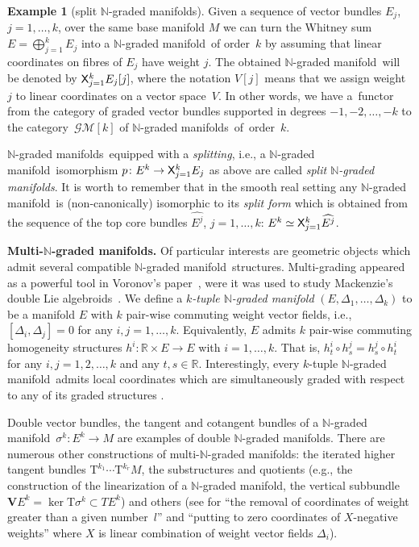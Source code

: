 \documentclass[10pt,a4paper]{amsart}
\newcommand{\grB}{{$\N$-graded manifold}}
\newcommand{\grBs}{{$\N$-graded manifolds}}
\newcommand{\degree}{{order}}
\newcommand{\R}{\mathbb{R}}
\newcommand{\N}{\mathbb{N}}
\newcommand{\V}{\mathbf{V}} %
\newcommand{\ra}{\rightarrow}
\newcommand{\Cross}{{\sf X}} %
\newcommand{\T}{\mathrm{T}} %
\newcommand{\core}[1]{\widehat{#1}} %
\newcommand{\catGB}{\mathcal{GM}}
\numberwithin{equation}{section}
\theoremstyle{definition}
\newtheorem{ex}[thm]{Example}
\begin{document}
\begin{ex}[split \grBs]\label{ex:split_gr_bndl} Given a sequence of vector bundles $E_j$, $j=1, \ldots, k$, over the same base manifold $M$ we can turn the Whitney sum $E =\bigoplus_{j=1}^k E_j$ into a \grB\ of \degree\ $k$ by assuming that linear coordinates on fibres of $E_j$ have weight $j$. The obtained \grB\ will be denoted by $\Cross_{j=1}^k E_j[j]$, where the notation $V[j]$ means that we assign weight $j$ to linear coordinates on a vector space~$V$. In other words, we have a~functor from the category of graded vector bundles supported in degrees $-1, -2, \ldots, -k$ to the category~$\catGB[k]$ of \grBs\ of~\degree\ $k$.

\grBs\ equipped with a \emph{splitting}, i.e., a \grB\ isomorphism $p\colon E^k \ra \Cross_{j=1}^k E_j$ as above are called \emph{split \grBs}. It is worth to remember that in the smooth real setting any \grB\ is (non-canonically) isomorphic to its \emph{split form} which is obtained from the sequence of the top core bundles $\core{E^j}$, $j=1, \ldots, k$: $E^k \simeq \Cross_{j=1}^k \core{E^j}$.
\end{ex}

{\bf Multi-\grBs.} Of particular interests are geometric objects which admit several compatible \grB\ structures. Multi-grading appeared as a powerful tool in Voronov's paper~\cite{Voronov_2012}, were it was used to study Mackenzie's double Lie algebroids~\cite{Mackenzie_1992}.
We define a \emph{$k$-tuple \grB} $(E, \Delta_1, \ldots, \Delta_k)$ to be a manifold $E$ with $k$ pair-wise commuting weight vector fields, i.e., $[\Delta_i,\Delta_j]=0$ for any $i,j=1,\hdots,k$. Equivalently, $E$ admits $k$ pair-wise commuting homogeneity structures $h^i\colon \R\times E\ra E$ with $i=1,\hdots,k$. That is, $h^i_t\circ h^j_s=h^j_s\circ h^i_t$ for any $i,j=1,2,\hdots,k$ and any $t,s\in\R$.
Interestingly, every $k$-tuple \grB\ admits local coordinates which are simultaneously graded with respect to any of its graded structures \cite[Theorem 5.2]{JG_MR_gr_bund_hgm_str_2011}.

 Double vector bundles, the tangent and cotangent bundles of a \grB\ \mbox{$\sigma^k\colon\! E^k{\ra} M$} are examples of double \grBs. There are numerous other constructions of multi-\grBs: the iterated higher tangent bundles $\T^{k_1} \cdots \T^{k_r} M$, the substructures and quotients (e.g., the construction of the linearization of a \grB, the vertical subbundle $\V E^k = \ker{\T \sigma^k} \subset T E^k$) and others (see \cite[Definitions~1.6 and~1.8]{BGR} for ``the removal of coordinates of weight greater than a given number~$l$'' and ``putting to zero coordinates of $X$-negative weights'' where $X$ is linear combination of weight vector fields $\Delta_i$).
\end{document}
